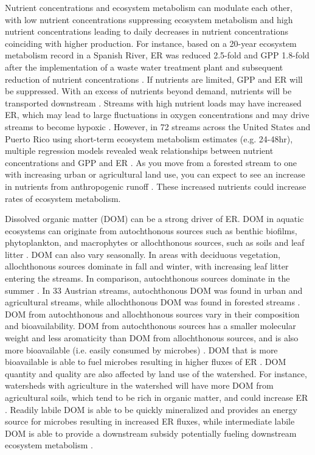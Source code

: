Nutrient concentrations and ecosystem metabolism can modulate each other, with low nutrient concentrations suppressing ecosystem metabolism and high nutrient concentrations leading to daily decreases in nutrient concentrations coinciding with higher production. For instance, based on a 20-year ecosystem metabolism record in a Spanish River, ER was reduced 2.5-fold and GPP 1.8-fold after the implementation of a waste water treatment plant and subsequent reduction of nutrient concentrations \cite{arroita_twenty_2019}. If nutrients are limited, GPP and ER will be suppressed. With an excess of nutrients beyond demand, nutrients will be transported downstream \cite{covino_measuring_2018}. Streams with high nutrient loads may have increased ER, which may lead to large fluctuations in oxygen concentrations and may drive streams to become hypoxic \cite{arroita_twenty_2019}. However, in 72 streams across the United States and Puerto Rico using short-term ecosystem metabolism estimates (e.g. 24-48hr), multiple regression models revealed weak relationships between nutrient concentrations and GPP and ER \cite{bernot_inter-regional_2010}. As you move from a forested stream to one with increasing urban or agricultural land use, you can expect to see an increase in nutrients from anthropogenic runoff \cite{bernot_nutrient_2006, fus_land_2017}. These increased nutrients could increase rates of ecosystem metabolism.

Dissolved organic matter (DOM) can be a strong driver of ER. DOM in aquatic ecosystems can originate from autochthonous sources such as benthic biofilms, phytoplankton, and macrophytes or allochthonous sources, such as soils and leaf litter \cite{bertilsson_supply_2003, fus_land_2017, wong_sources_2010}. DOM can also vary seasonally. In areas with deciduous vegetation, allochthonous sources dominate in fall and winter, with increasing leaf litter entering the streams. In comparison, autochthonous sources dominate in the summer \cite{aitkenhead-peterson_sources_2003}. In 33 Austrian streams, autochthonous DOM was found in urban and agricultural streams, while allochthonous DOM was found in forested streams \cite{fus_land_2017}. DOM from autochthonous and allochthonous sources vary in their composition and bioavailability. DOM from autochthonous sources has a smaller molecular weight and less aromaticity than DOM from allochthonous sources, and is also more bioavailable (i.e. easily consumed by microbes) \cite{wong_sources_2010}. DOM that is more bioavailable is able to fuel microbes resulting in higher fluxes of ER \cite{fus_land_2017}. DOM quantity and quality are also affected by land use of the watershed. For instance, watersheds with agriculture in the watershed will have more DOM from agricultural soils, which tend to be rich in organic matter, and could increase ER \cite{fus_land_2017}. Readily labile DOM is able to be quickly mineralized and provides an energy source for microbes resulting in increased ER fluxes, while intermediate labile DOM is able to provide a downstream subsidy potentially fueling downstream ecosystem metabolism \cite{wiegner_contribution_2005}. 

